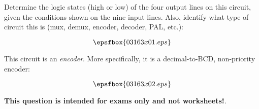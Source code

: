 

Determine the logic states (high or low) of the four output lines on this circuit, given the conditions shown on the nine input lines.  Also, identify what type of circuit this is (mux, demux, encoder, decoder, PAL, etc.):

$$\epsfbox{03163x01.eps}$$







This circuit is an {\it encoder}.  More specifically, it is a decimal-to-BCD, non-priority encoder:

$$\epsfbox{03163x02.eps}$$







{\bf This question is intended for exams only and not worksheets!}.




